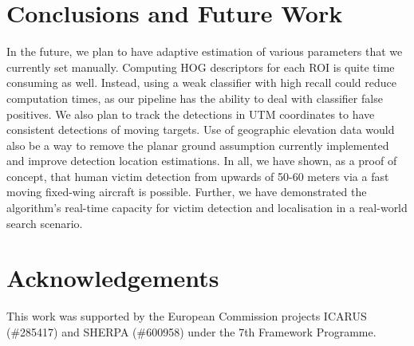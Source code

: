 \documentclass[runningheads]{llncs}
\begin{document}
\section{Conclusions and Future Work}

In the future, we plan to have adaptive estimation of various parameters that we currently set manually. Computing HOG descriptors for each ROI is quite time consuming as well. Instead, using a weak classifier with high recall could reduce computation times, as our pipeline has the ability to deal with classifier false positives. We also plan to track the detections in UTM coordinates to have consistent detections of moving targets. Use of geographic elevation data would also be a way to remove the planar ground assumption currently implemented and improve detection location estimations. In all, we have shown, as a proof of concept, that human victim detection from upwards of 50-60 meters via a fast moving fixed-wing aircraft is possible. Further, we have demonstrated the algorithm's real-time capacity for victim detection and localisation in a real-world search scenario.

\section*{Acknowledgements}

This work was supported by the European Commission projects ICARUS (\#285417) and SHERPA (\#600958) under the 7th Framework Programme.

\nocite{bal:cha:gra:pae}


\end{document}
